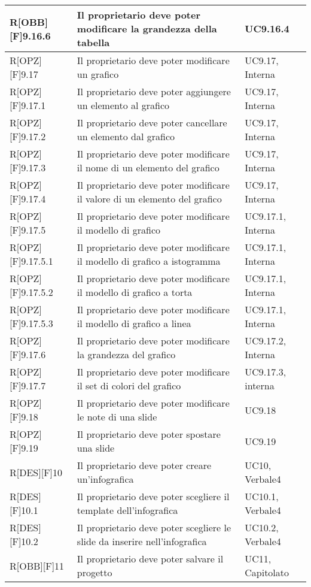 	\begin{table}[h]
		\begin{tabular}{|p{}|p{}|p{}|}
			\midrule

			R[OBB][F]9.16.6 & Il proprietario deve poter modificare la grandezza della tabella & UC9.16.4 \\ \midrule
			R[OPZ][F]9.17 & Il proprietario deve poter modificare un grafico & UC9.17, Interna \\ \midrule
			R[OPZ][F]9.17.1 & Il proprietario deve poter aggiungere un elemento al grafico & UC9.17, Interna \\ \midrule
			R[OPZ][F]9.17.2 & Il proprietario deve poter cancellare un elemento dal grafico & UC9.17, Interna \\ \midrule
			R[OPZ][F]9.17.3 & Il proprietario deve poter modificare il nome di un elemento del grafico & UC9.17, Interna \\ \midrule
			R[OPZ][F]9.17.4 & Il proprietario deve poter modificare il valore di un elemento del grafico & UC9.17, Interna \\ \midrule
			R[OPZ][F]9.17.5 & Il proprietario deve poter modificare il modello di grafico & UC9.17.1, Interna \\ \midrule
			R[OPZ][F]9.17.5.1 & Il proprietario deve poter modificare il modello di grafico a istogramma & UC9.17.1, Interna \\ \midrule
			R[OPZ][F]9.17.5.2 & Il proprietario deve poter modificare il modello di grafico a torta & UC9.17.1, Interna \\ \midrule
			R[OPZ][F]9.17.5.3 & Il proprietario deve poter modificare il modello di grafico a linea & UC9.17.1, Interna \\ \midrule
			R[OPZ][F]9.17.6 & Il proprietario deve poter modificare la grandezza del grafico & UC9.17.2, Interna \\ \midrule
			R[OPZ][F]9.17.7 & Il proprietario deve poter modificare il set di colori del grafico & UC9.17.3, interna \\ \midrule
			R[OPZ][F]9.18 & Il proprietario deve poter modificare le note di una slide & UC9.18 \\ \midrule
			R[OPZ][F]9.19 & Il proprietario deve poter spostare una slide & UC9.19 \\ \midrule
			R[DES][F]10 & Il proprietario deve poter creare un'\gls{infografica} & UC10, Verbale4 \\ \midrule
			R[DES][F]10.1 & Il proprietario deve poter scegliere il \gls{template} dell'\gls{infografica} & UC10.1, Verbale4 \\ \midrule
			R[DES][F]10.2 & Il proprietario deve poter scegliere le \gls{slide} da inserire nell'\gls{infografica} & UC10.2, Verbale4 \\ \midrule
			R[OBB][F]11 & Il proprietario deve poter salvare il progetto & UC11, Capitolato  \\ \midrule

	\end{tabular}
	\end{table}
	\newpage
	
